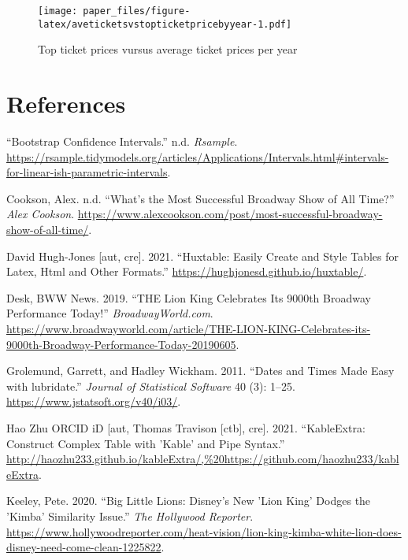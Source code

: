 \documentclass[
]{article}
\begin{document}
\begin{figure}
\centering
\texttt{[image: paper\_files/figure-latex/aveticketsvstopticketpricebyyear-1.pdf]}
\caption{\label{fig:aveticketsvstopticketpricebyyear}Top ticket prices vursus average ticket prices per year}
\end{figure}

\newpage

\hypertarget{references}{%
\section*{References}\label{references}}

\hypertarget{refs}{}
\leavevmode\hypertarget{ref-confidenceInt}{}%
``Bootstrap Confidence Intervals.'' n.d. \emph{Rsample}. \url{https://rsample.tidymodels.org/articles/Applications/Intervals.html\#intervals-for-linear-ish-parametric-intervals}.

\leavevmode\hypertarget{ref-alex}{}%
Cookson, Alex. n.d. ``What's the Most Successful Broadway Show of All Time?'' \emph{Alex Cookson}. \url{https://www.alexcookson.com/post/most-successful-broadway-show-of-all-time/}.

\leavevmode\hypertarget{ref-hux}{}%
David Hugh-Jones {[}aut, cre{]}. 2021. ``Huxtable: Easily Create and Style Tables for Latex, Html and Other Formats.'' \url{https://hughjonesd.github.io/huxtable/}.

\leavevmode\hypertarget{ref-lk}{}%
Desk, BWW News. 2019. ``THE Lion King Celebrates Its 9000th Broadway Performance Today!'' \emph{BroadwayWorld.com}. \url{https://www.broadwayworld.com/article/THE-LION-KING-Celebrates-its-9000th-Broadway-Performance-Today-20190605}.

\leavevmode\hypertarget{ref-lubr}{}%
Grolemund, Garrett, and Hadley Wickham. 2011. ``Dates and Times Made Easy with lubridate.'' \emph{Journal of Statistical Software} 40 (3): 1--25. \url{https://www.jstatsoft.org/v40/i03/}.

\leavevmode\hypertarget{ref-KablExtra}{}%
Hao Zhu ORCID iD {[}aut, Thomas Travison {[}ctb{]}, cre{]}. 2021. ``KableExtra: Construct Complex Table with 'Kable' and Pipe Syntax.'' \url{http://haozhu233.github.io/kableExtra/,\%20https://github.com/haozhu233/kableExtra}.

\leavevmode\hypertarget{ref-keeley_2020}{}%
Keeley, Pete. 2020. ``Big Little Lions: Disney's New 'Lion King' Dodges the 'Kimba' Similarity Issue.'' \emph{The Hollywood Reporter}. \url{https://www.hollywoodreporter.com/heat-vision/lion-king-kimba-white-lion-does-disney-need-come-clean-1225822}.
\end{document}
